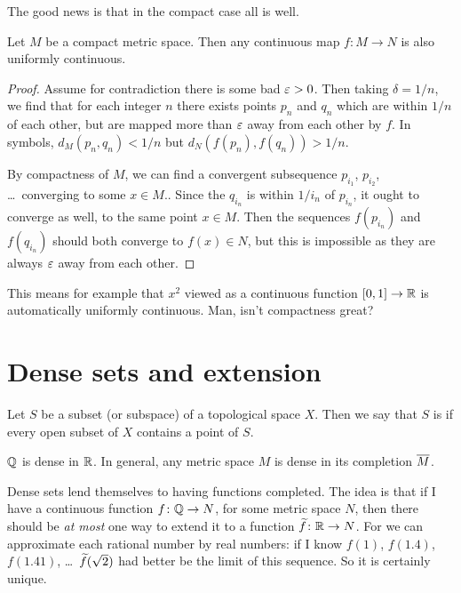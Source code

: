 The good news is that in the compact case all is well.
\begin{theorem}
	Let $M$ be a compact metric space.
	Then any continuous map $f \colon M \to N$ is
	also uniformly continuous.
\end{theorem}
\begin{proof}
	Assume for contradiction there is some bad $\varepsilon > 0$.
	Then taking $\delta = 1/n$,
	we find that for each integer $n$
	there exists points $p_n$ and $q_n$
	which are within $1/n$ of each other,
	but are mapped more than $\varepsilon$ away from each other by $f$.
	In symbols, $d_M(p_n, q_n) < 1/n$ but $d_N(f(p_n), f(q_n)) > 1/n$.

	By compactness of $M$,
	we can find a convergent subsequence
	$p_{i_1}$, $p_{i_2}$, \dots\ converging to some $x \in M$..
	Since the $q_{i_n}$ is within $1/i_n$ of $p_{i_n}$,
	it ought to converge as well, to the same point $x \in M$.
	Then the sequences $f(p_{i_n})$ and $f(q_{i_n})$
	should both converge to $f(x) \in N$,
	but this is impossible as they are always $\varepsilon$
	away from  each other.
\end{proof}
This means for example that $x^2$ viewed
as a continuous function $[0,1] \to \mathbb R$ is automatically
uniformly continuous.
Man, isn't compactness great?

\section{Dense sets and extension}

\begin{definition}
	Let $S$ be a subset (or subspace) of a topological space $X$.
	Then we say that $S$ is 
	if every open subset of $X$ contains a point of $S$.
\end{definition}

\begin{example}
	\listhack
	\begin{enumerate}[(a)]
		\ii $\mathbb Q$ is dense in $\mathbb R$.
		\ii In general, any metric space $M$ is dense
		in its completion $\overline M$.
	\end{enumerate}
\end{example}

Dense sets lend themselves to having functions completed.
The idea is that if I have a continuous function
$f \colon \mathbb Q \to N$, for some metric space $N$,
then there should be \emph{at most} one way to extend it to a function
$\widetilde f \colon \mathbb R \to N$.
For we can approximate each rational number by real numbers:
if I know $f(1)$, $f(1.4)$, $f(1.41)$, \dots\
$\widetilde f(\sqrt2)$ had better be the limit of this sequence.
So it is certainly unique.

